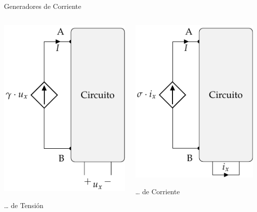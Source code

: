 \documentclass[aspectratio=169, usenames,svgnames,dvipsnames]{beamer}
\begin{document}
\begin{frame}[label={sec:org2799292}]{Generadores de Corriente}
\begin{columns}
\begin{column}{0.5\columnwidth}
 \begin{center}
\includegraphics[height=0.7\textheight]{../figs/FuenteCorrienteDependienteTension.pdf}
\end{center}
\ldots{} de Tensión
\end{column}
\begin{column}{0.5\columnwidth}
 \begin{center}
\includegraphics[height=0.7\textheight]{../figs/FuenteCorrienteDependienteCorriente.pdf}
\end{center}
\ldots{} de Corriente
\end{column}
\end{columns}
\end{frame}
\end{document}
